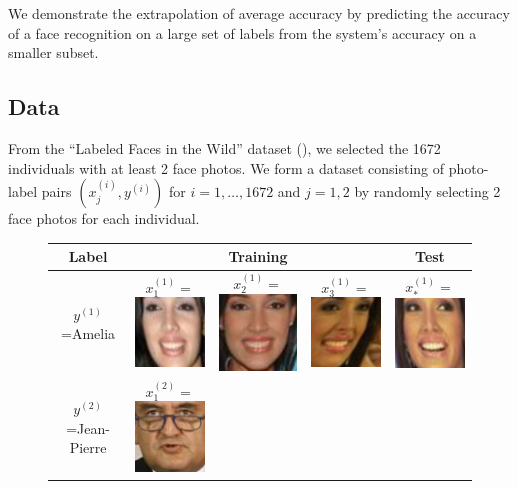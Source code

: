 \documentclass[twoside,11pt]{article}
\begin{document}
We demonstrate the extrapolation of average accuracy by predicting the
accuracy of a face recognition on a large set of labels from the
system's accuracy on a smaller subset.

\subsection{Data}
From the ``Labeled Faces in the Wild'' dataset (\cite{LFWTech}), we
selected the 1672 individuals with at least 2 face photos.  We form a
dataset consisting of photo-label pairs $(x_j^{(i)}, y^{(i)})$
for $i = 1,\hdots, 1672$ and $j = 1,2$ by randomly selecting 2 face
photos for each individual. 

\begin{figure}
\centering
\begin{tabular}{|c|ccc|c|}
\hline
Label & & Training & & Test\\ \hline
$y^{(1)}$=Amelia & 
  $x_1^{(1)} = $\includegraphics[scale = 0.2]{face_photos/Amelia_Vega_0001.png} &  
  $x_2^{(1)} = $\includegraphics[scale = 0.2]{face_photos/Amelia_Vega_0002.png} &  
  $x_3^{(1)} = $\includegraphics[scale = 0.2]{face_photos/Amelia_Vega_0003.png} &  
  $x_*^{(1)} = $\includegraphics[scale = 0.2]{face_photos/Amelia_Vega_0004.png} \\ \hline
$y^{(2)}$=Jean-Pierre & 
  $x_1^{(2)} = $\includegraphics[scale = 0.2]{face_photos/Jean-Pierre_Raffarin_0001.png} &  

\end{tabular}
\end{figure}
\end{document}
